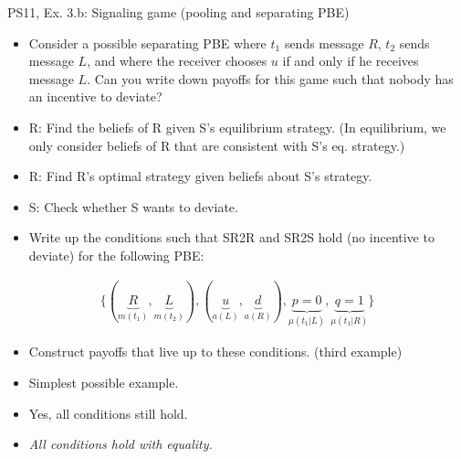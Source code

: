 \begin{frame}{PS11, Ex. 3.b: Signaling game (pooling and separating PBE)}
    \begin{itemize}
        \item[(b)] Consider a possible separating PBE where $t_1$ sends message $R$, $t_2$ sends message $L$, and where the receiver chooses $u$ if and only if he receives message $L$. Can you write down payoffs for this game such that nobody has an incentive to deviate?
    \end{itemize} \vspace{-8pt}
    \begin{multicols}{2}
      \begin{itemize}
        \item[SR3:] R: Find the beliefs of R given S's equilibrium strategy. (In equilibrium, we only consider beliefs of R that are consistent with S's eq. strategy.)
        \item[SR2R:] R: Find R's optimal strategy given beliefs about S's strategy.
        \item[SR2S:] S: Check whether S wants to deviate.
        \item[PBE:]  Write up the conditions such that SR2R and SR2S hold (no incentive to deviate) for the following PBE:
      \end{itemize}\vspace{-16pt}
      \begin{align*}
        \{(\underbrace{R}_{m(t_1)},\underbrace{L}_{m(t_2)}),(\underbrace{u}_{a(L)},\underbrace{d}_{a(R)}),\underbrace{p=0}_{\mu(t_1|L)},\underbrace{q=1}_{\mu(t_1|R)}\}
      \end{align*}\vspace{-17pt}
      \begin{itemize}
        \item[$\rightarrow$] Construct payoffs that live up to these conditions. (third example)
        \item[i:] \vspace{-1pt}Simplest possible example.
        \item[ii:] \vspace{-1pt}Yes, all conditions still hold.
        \item[iii:] \vspace{-1pt}\textit{All conditions hold with equality.}
      \end{itemize}
      \vfill\null\columnbreak
      \begin{figure}[!h]
        \center{}

\end{figure}
\end{multicols}
\end{frame}
